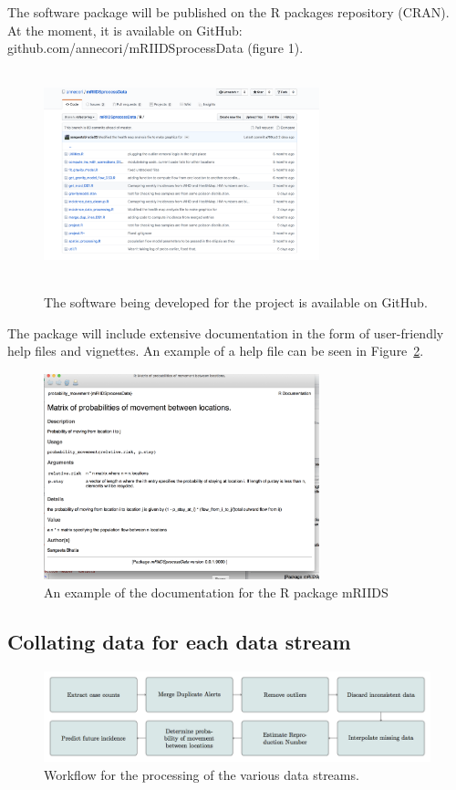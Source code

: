 \documentclass[11pt,]{article}
\begin{document}
The software
package will be published on the R packages repository
(CRAN). At the moment, it is available on GitHub: github.com/annecori/mRIIDSprocessData (figure 1).

\begin{figure}
   \centering
  \includegraphics[width=8cm, height = 6cm]{ms6-figures/github-screenshot}
  \label{fig:github}
  \caption{The software being developed for the project is available
    on GitHub.}
\end{figure}


The package will include extensive documentation in the form of
user-friendly help files and vignettes. An example of a help file can
be seen in Figure~\ref{fig:helpfile}.


\begin{figure}
  \centering
  \includegraphics[width=8cm, height = 6cm]{ms6-figures/Helpfile-screenshot}
  \caption{An example of the documentation for the R package mRIIDS}
  \label{fig:helpfile}
\end{figure}

\FloatBarrier
\subsection{Collating data for each data stream}
\begin{center}
\begin{figure}
\includegraphics[]{ms6-figures/workflow}
\caption{Workflow for the processing of the various data streams.}
\label{fig:workflow}
\end{figure}
\end{center}
\end{document}
